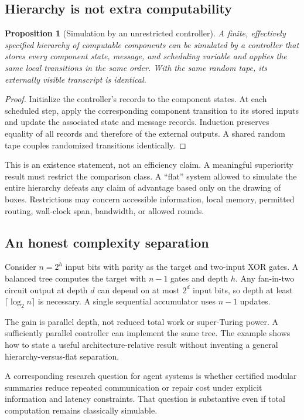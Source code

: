 \documentclass[11pt,letterpaper]{article}
\theoremstyle{plain}
\newtheorem{proposition}{Proposition}[section]
\theoremstyle{definition}
\theoremstyle{remark}
\begin{document}
\subsection{Hierarchy is not extra computability}
\begin{proposition}[Simulation by an unrestricted controller]\label{prop:flatten}
A finite, effectively specified hierarchy of computable components can be simulated by a controller that stores every component state, message, and scheduling variable and applies the same local transitions in the same order. With the same random tape, its externally visible transcript is identical.
\end{proposition}
\begin{proof}
Initialize the controller's records to the component states. At each scheduled step, apply the corresponding component transition to its stored inputs and update the associated state and message records. Induction preserves equality of all records and therefore of the external outputs. A shared random tape couples randomized transitions identically.
\end{proof}

This is an existence statement, not an efficiency claim. A meaningful superiority result must restrict the comparison class. A ``flat'' system allowed to simulate the entire hierarchy defeats any claim of advantage based only on the drawing of boxes. Restrictions may concern accessible information, local memory, permitted routing, wall-clock span, bandwidth, or allowed rounds.

\subsection{An honest complexity separation}
Consider $n=2^h$ input bits with parity as the target and two-input XOR gates. A balanced tree computes the target with $n-1$ gates and depth $h$. Any fan-in-two circuit output at depth $d$ can depend on at most $2^d$ input bits, so depth at least $\lceil\log_2n\rceil$ is necessary. A single sequential accumulator uses $n-1$ updates.

The gain is parallel depth, not reduced total work or super-Turing power. A sufficiently parallel controller can implement the same tree. The example shows how to state a useful architecture-relative result without inventing a general hierarchy-versus-flat separation.

A corresponding research question for agent systems is whether certified modular summaries reduce repeated communication or repair cost under explicit information and latency constraints. That question is substantive even if total computation remains classically simulable.
\end{document}
